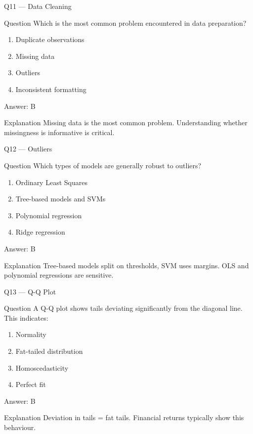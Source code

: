 \documentclass[aspectratio=169,8pt]{beamer}
\begin{document}
	\begin{frame}{Q11 --- Data Cleaning}
		\begin{block}{Question}
			Which is the most common problem encountered in data preparation?
		\end{block}
		\begin{enumerate}
			\item Duplicate observations
			\item Missing data
			\item Outliers
			\item Inconsistent formatting
		\end{enumerate}
		\begin{exampleblock}{Answer: B}\end{exampleblock}
		\begin{block}{Explanation}
			Missing data is the most common problem. Understanding whether missingness is informative is critical.
		\end{block}
	\end{frame}
	
	\begin{frame}{Q12 --- Outliers}
		\begin{block}{Question}
			Which types of models are generally robust to outliers?
		\end{block}
		\begin{enumerate}
			\item Ordinary Least Squares
			\item Tree-based models and SVMs
			\item Polynomial regression
			\item Ridge regression
		\end{enumerate}
		\begin{exampleblock}{Answer: B}\end{exampleblock}
		\begin{block}{Explanation}
			Tree-based models split on thresholds, SVM uses margins. OLS and polynomial regressions are sensitive.
		\end{block}
	\end{frame}
	
	\begin{frame}{Q13 --- Q-Q Plot}
		\begin{block}{Question}
			A Q-Q plot shows tails deviating significantly from the diagonal line. This indicates:
		\end{block}
		\begin{enumerate}
			\item Normality
			\item Fat-tailed distribution
			\item Homoscedasticity
			\item Perfect fit
		\end{enumerate}
		\begin{exampleblock}{Answer: B}\end{exampleblock}
		\begin{block}{Explanation}
			Deviation in tails = fat tails. Financial returns typically show this behaviour.
		\end{block}
	\end{frame}
	
\end{document}
